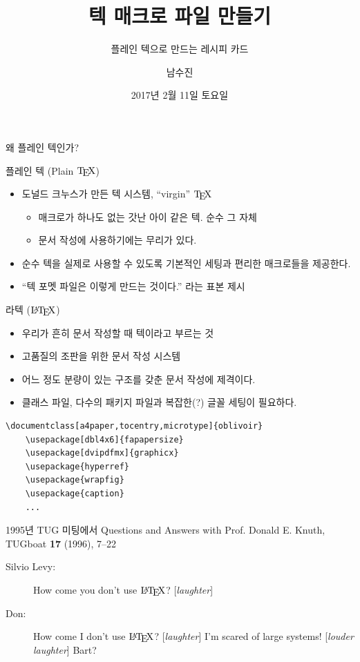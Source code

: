 \documentclass{beamer}
\title{텍 매크로 파일 만들기}
\subtitle{플레인 텍으로 만드는 레시피 카드}
\date{2017년 2월 11일 토요일}
\author{남수진}
\institute{
  2017 한국텍학회 학술대회 및 정기총회 \\
  동국대학교 법학관 B253호}
\def\TEX/{$\textrm{\TeX}$}
\def\LATEX/{$\textrm{\LaTeX}$}
\begin{document}
\maketitle

%
\begin{frame}[standout]
  왜 플레인 텍인가?
\end{frame}


%
\begin{frame}[fragile]{플레인 텍 (Plain \TEX/)}
  \begin{itemize}
  \item 도널드 크누스가 만든 텍 시스템, \alert{``virgin'' \TEX/}
    \begin{itemize}
    \item 매크로가 하나도 없는 갓난 아이 같은 텍. 순수 그 자체
    \item 문서 작성에 사용하기에는 무리가 있다.
    \end{itemize}
  \item 순수 텍을 실제로 사용할 수 있도록 기본적인 세팅과 편리한 매크로들을 제공한다.
  \item ``텍 포멧 파일은 이렇게 만드는 것이다.'' 라는 표본 제시
  \end{itemize}
\end{frame}


%
\begin{frame}[fragile]{라텍 (\LATEX/)}
  \begin{itemize}
  \item 우리가 흔히 문서 작성할 때 텍이라고 부르는 것
  \item 고품질의 조판을 위한 문서 작성 시스템
  \item 어느 정도 분량이 있는 구조를 갖춘 문서 작성에 제격이다.
  \item 클래스 파일, 다수의 패키지 파일과 복잡한(?) 글꼴 세팅이 필요하다.
  \end{itemize}
  
  \begin{Verbatim}[fontsize=\small]
    \documentclass[a4paper,tocentry,microtype]{oblivoir}
    \usepackage[dbl4x6]{fapapersize}
    \usepackage[dvipdfmx]{graphicx}
    \usepackage{hyperref}
    \usepackage{wrapfig}
    \usepackage{caption}
    ...
  \end{Verbatim}
\end{frame}


%
\begin{frame}{1995년 TUG 미팅에서}
  Questions and Answers with Prof. Donald E. Knuth, 
  TUGboat \textbf{17} (1996), 7--22
  \begin{description}
  \item[Silvio Levy:] How come you don't use \LATEX/? [\textsl{laughter}]
  \item[Don:] How come I don't use \LATEX/? [\textsl{laughter}]
    I'm scared of \alert{large systems!} [\textsl{louder laughter\/}]
    Bart?
  \end{description}
\end{frame}
\end{document}
